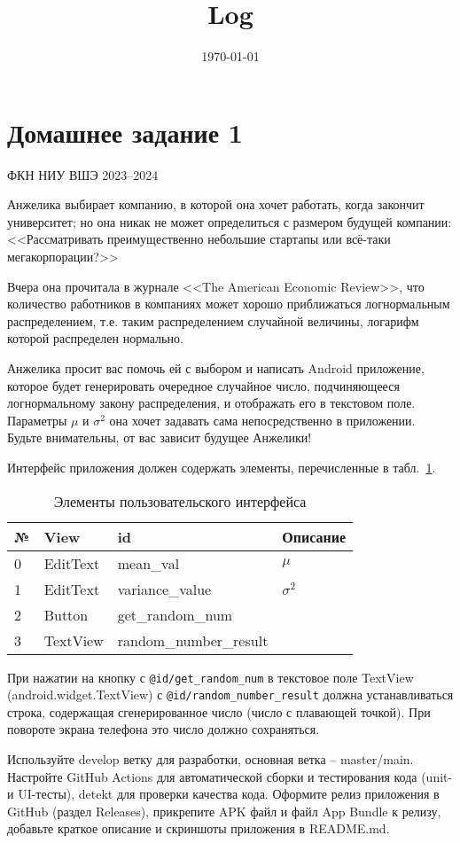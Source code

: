 \documentclass{article}
\title{Log}
\author{}
\date{\today}
\begin{document}
\section*{Домашнее задание 1}

ФКН НИУ ВШЭ 2023--2024 \vspace{1.5em}

Анжелика выбирает компанию, в которой она хочет работать, когда закончит университет; но она никак не может определиться с размером будущей компании: <<Рассматривать преимущественно небольшие стартапы или всё-таки мегакорпорации?>>

Вчера она прочитала в журнале <<The American Economic Review>>, что количество работников в компаниях может хорошо приближаться логнормальным распределением, т.е. таким распределением случайной величины, логарифм которой распределен нормально.

Анжелика просит вас помочь ей с выбором и написать Android приложение, которое будет генерировать очередное случайное число, подчиняющееся логнормальному закону распределения, и отображать его в текстовом поле. Параметры $\mu$ и $\sigma ^2$ она хочет задавать сама непосредственно в приложении.
Будьте внимательны, от вас зависит будущее Анжелики!

Интерфейс приложения должен содержать элементы, перечисленные в табл.~\ref{table:layout:ids}.


\begin{table}[h]
\begin{center}
    \begin{tabularx}{0.78\textwidth}{p{3ex} p{13ex} X p{10ex}}
\midrule\toprule
№ & View       & id            &   Описание \\ \midrule
0 & EditText        & mean\_val   &   $\mu$ \\
1 & EditText        & variance\_value        &  $\sigma ^2$  \\
2 & Button            & get\_random\_num  & $	 $   \\
3 & TextView        & random\_number\_result         & $	 $    \\

\bottomrule\midrule
    \end{tabularx}
    \caption{Элементы пользовательского интерфейса}
    \label{table:layout:ids}
\end{center}
\end{table}


При нажатии на кнопку с \texttt{@id/get\_random\_num} в текстовое поле TextView  (android.widget.TextView) с \texttt{@id/random\_number\_result} должна устанавливаться строка, 
содержащая сгенерированное число (число с плавающей точкой).
При повороте экрана телефона это число должно сохраняться.


Используйте develop ветку для разработки, основная ветка -- master/main. Настройте GitHub Actions для автоматической сборки и тестирования кода (unit- и UI-тесты), detekt для проверки качества кода.
Оформите релиз приложения в GitHub (раздел Releases), прикрепите APK файл и файл App Bundle к релизу, добавьте краткое описание и скриншоты приложения в README.md.
\end{document}

